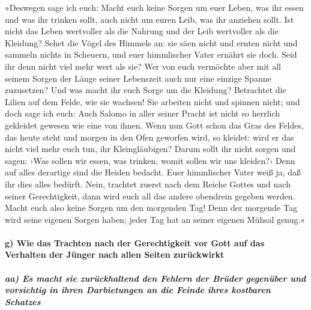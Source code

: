  »Deswegen sage ich euch: Macht euch keine Sorgen um euer
Leben, was ihr essen und was ihr trinken sollt, auch nicht um euren
Leib, was ihr anziehen sollt. Ist nicht das Leben wertvoller als die
Nahrung und der Leib wertvoller als die Kleidung?  Sehet
die Vögel des Himmels an: sie säen nicht und ernten nicht und sammeln
nichts in Scheuern, und euer himmlischer Vater ernährt sie doch. Seid
ihr denn nicht viel mehr wert als sie?  Wer von euch
vermöchte aber mit all seinem Sorgen der Länge seiner Lebenszeit auch
nur eine einzige Spanne zuzusetzen?  Und was macht ihr
euch Sorge um die Kleidung? Betrachtet die Lilien auf dem Felde, wie sie
wachsen! Sie arbeiten nicht und spinnen nicht;  und doch
sage ich euch: Auch Salomo in aller seiner Pracht ist nicht so herrlich
gekleidet gewesen wie eine von ihnen.  Wenn nun Gott
schon das Gras des Feldes, das heute steht und morgen in den Ofen
geworfen wird, so kleidet: wird er das nicht viel mehr euch tun, ihr
Kleingläubigen?  Darum sollt ihr nicht sorgen und sagen:
›Was sollen wir essen, was trinken, womit sollen wir uns kleiden?‹
 Denn auf alles derartige sind die Heiden bedacht. Euer
himmlischer Vater weiß ja, daß ihr dies alles bedürft. 
Nein, trachtet zuerst nach dem Reiche Gottes und nach seiner
Gerechtigkeit, dann wird euch all das andere obendrein gegeben werden.
 Macht euch also keine Sorgen um den morgenden Tag! Denn
der morgende Tag wird seine eigenen Sorgen haben; jeder Tag hat an
seiner eigenen Mühsal genug.«

\hypertarget{g-wie-das-trachten-nach-der-gerechtigkeit-vor-gott-auf-das-verhalten-der-juxfcnger-nach-allen-seiten-zuruxfcckwirkt}{%
\paragraph{g) Wie das Trachten nach der Gerechtigkeit vor Gott auf das
Verhalten der Jünger nach allen Seiten
zurückwirkt}\label{g-wie-das-trachten-nach-der-gerechtigkeit-vor-gott-auf-das-verhalten-der-juxfcnger-nach-allen-seiten-zuruxfcckwirkt}}

\hypertarget{aa-es-macht-sie-zuruxfcckhaltend-den-fehlern-der-bruxfcder-gegenuxfcber-und-vorsichtig-in-ihren-darbietungen-an-die-feinde-ihres-kostbaren-schatzes}{%
\subparagraph{aa) Es macht sie zurückhaltend den Fehlern der Brüder
gegenüber und vorsichtig in ihren Darbietungen an die Feinde ihres
kostbaren
Schatzes}\label{aa-es-macht-sie-zuruxfcckhaltend-den-fehlern-der-bruxfcder-gegenuxfcber-und-vorsichtig-in-ihren-darbietungen-an-die-feinde-ihres-kostbaren-schatzes}}

